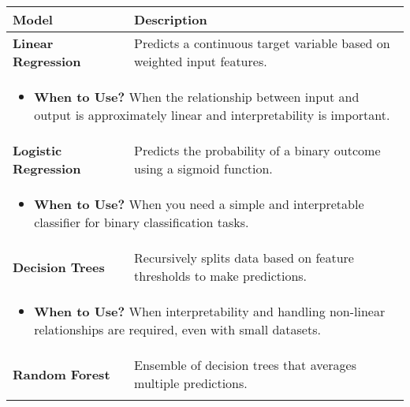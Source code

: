 \documentclass{article}
\begin{document}
\begin{definition}
    
\end{definition}

\begin{example}
    
\end{example}
\newpage

\begin{summary}
    \begin{center}
        \begin{tabular}{ll}
        \toprule
        \textbf{Model} & \textbf{Description} \\
        \midrule
        \textbf{Linear Regression} & Predicts a continuous target variable based on weighted input features. \\
        \multicolumn{2}{p{\linewidth}}{
        \begin{itemize}
            \item \textbf{When to Use?} When the relationship between input and output is approximately linear and interpretability is important.
        \end{itemize}} \\
        \midrule
        \textbf{Logistic Regression} & Predicts the probability of a binary outcome using a sigmoid function. \\
        \multicolumn{2}{p{\linewidth}}{
        \begin{itemize}
            \item \textbf{When to Use?} When you need a simple and interpretable classifier for binary classification tasks.
        \end{itemize}} \\
        \midrule
        \textbf{Decision Trees} & Recursively splits data based on feature thresholds to make predictions. \\
        \multicolumn{2}{p{\linewidth}}{
        \begin{itemize}
            \item \textbf{When to Use?} When interpretability and handling non-linear relationships are required, even with small datasets.
        \end{itemize}} \\
        \midrule
        \textbf{Random Forest} & Ensemble of decision trees that averages multiple predictions. \\
        \multicolumn{2}{p{\linewidth}}{
        \begin{itemize}

\end{itemize}}
\end{tabular}
\end{center}
\end{summary}
\end{document}
